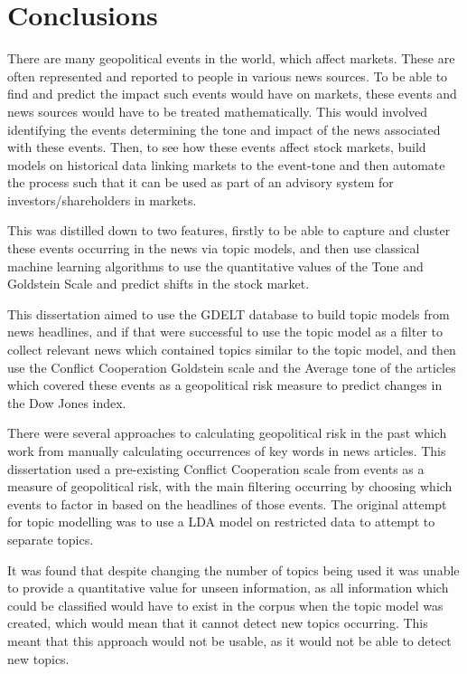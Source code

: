 \section{Conclusions}
\label{conclusions}
There are many geopolitical events in the world, which affect markets. These are often represented and reported to people in various news sources. To be able to find and predict the impact such events would have on markets, these events and news sources would have to be treated mathematically. This would involved identifying the events determining the tone and impact of the news associated with these events. Then, to see how these events affect stock markets, build models on historical data linking markets to the event-tone and then automate the process such that it can be used as part of an advisory system for investors/shareholders in markets. 

This was distilled down to two features, firstly to be able to capture and cluster these events occurring in the news via topic models, and then use classical machine learning algorithms to use the quantitative values of the Tone and Goldstein Scale and predict shifts in the stock market. 

This dissertation aimed to use the GDELT database to build topic models from news headlines, and if that were successful to use the topic model as a filter to collect relevant news which contained topics similar to the topic model, and then use the Conflict Cooperation Goldstein scale and the Average tone of the articles which covered these events as a geopolitical risk measure to predict changes in the Dow Jones index. 

There were several approaches to calculating geopolitical risk in the past which work from manually calculating occurrences of key words in news articles. This dissertation used a pre-existing Conflict Cooperation scale from events as a measure of geopolitical risk, with the main filtering occurring by choosing which events to factor in based on the headlines of those events.  The original attempt for topic modelling was to use a LDA model on restricted data to attempt to separate topics.    

It was found that despite changing the number of topics being used it was unable to provide a quantitative value for unseen information, as all information which could be classified would have to exist in the corpus when the topic model was created, which would mean that it cannot detect new topics occurring. This meant that this approach would not be usable, as it would not be able to detect new topics.

